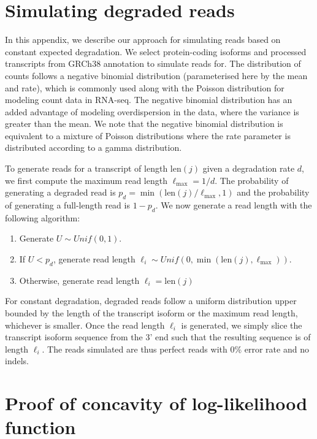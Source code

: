 \chapter{Simulating degraded reads}\label{ap:sim-deg-reads}

In this appendix, we describe our approach for simulating reads based on constant expected degradation. We select protein-coding isoforms and processed transcripts from GRCh38 annotation to simulate reads for. The distribution of counts follows a negative binomial distribution (parameterised here by the mean and rate), which is commonly used along with the Poisson distribution for modeling count data in RNA-seq. The negative binomial distribution has an added advantage of modeling overdispersion in the data, where the variance is greater than the mean. We note that the negative binomial distribution is equivalent to a mixture of Poisson distributions where the rate parameter is distributed according to a gamma distribution. 

To generate reads for a transcript of length $\mathrm{len}(j)$ given a degradation rate $d$, we first compute the maximum read length $\ell_\mathrm{max}=1/d$. The probability of generating a degraded read is $p_d=\min(\mathrm{len}(j)/\ell_\mathrm{max}, 1)$ and the probability of generating a full-length read is $1-p_d$. We now generate a read length with the following algorithm:
\begin{enumerate}
    \item Generate $U\sim Unif(0,1)$.
    \item If $U<p_d$, generate read length $\ell_i\sim Unif(0,\min(\mathrm{len}(j),\ell_\mathrm{max}))$.
    \item Otherwise, generate read length $\ell_i=\mathrm{len}(j)$
\end{enumerate}
For constant degradation, degraded reads follow a uniform distribution upper bounded by the length of the transcript isoform or the maximum read length, whichever is smaller. Once the read length $\ell_i$ is generated, we simply slice the transcript isoform sequence from the 3' end such that the resulting sequence is of length $\ell_i$. The reads simulated are thus perfect reads with 0\% error rate and no indels. 

\chapter{Proof of concavity of log-likelihood function}\label{sec:proof-log-lik}

